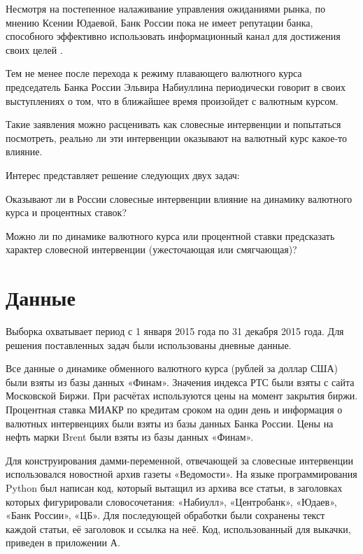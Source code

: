 \documentclass[14pt,a4paper, oneside]{extreport}
\newcounter{notes}
\renewenvironment{enumerate}%
{\begin{list}{\arabic{notes})} {\usecounter{notes}%
\setlength{\parsep}{0em}%
\setlength{\itemsep}{0em}%
\setlength{\topsep}{0.75ex}%
\setlength{\parskip}{0em}
}}%
{\end{list}}
\theoremstyle{plain}              %
\theoremstyle{definition}         %
\begin{document}
Несмотря на постепенное налаживание управления ожиданиями рынка, по мнению Ксении Юдаевой, Банк России пока не имеет репутации банка, способного эффективно использовать информационный канал для достижения своих целей \cite{UDAEVA}. 

Тем не менее после перехода к режиму плавающего валютного курса председатель Банка России Эльвира Набиуллина периодически говорит в своих выступлениях о том, что в ближайшее время произойдет с валютным курсом. 

Такие заявления можно расценивать как словесные интервенции и попытаться посмотреть, реально ли эти интервенции оказывают на валютный курс какое-то влияние.

Интерес представляет решение следующих двух задач:

\begin{enumerate}

\item[\textbf{Прямая задача:}] Оказывают ли в России словесные интервенции влияние на динамику валютного курса и процентных ставок?

\item[\textbf{Двойственная задача:}] Можно ли по динамике валютного курса или процентной ставки предсказать характер словесной интервенции (ужесточающая или смягчающая)?
\end{enumerate}

\section{Данные}

Выборка охватывает период с 1 января 2015 года по 31 декабря 2015 года. Для решения поставленных задач были использованы дневные данные. 

Все данные о динамике обменного валютного курса (рублей за доллар США)  были взяты из базы данных  «Финам». Значения индекса РТС были взяты с сайта Московской Биржи. При расчётах используются цены на момент закрытия биржи. Процентная ставка МИАКР по кредитам сроком на один день и информация о валютных интервенциях были взяты из базы данных Банка России. Цены на нефть марки Brent были взяты из базы данных «Финам».

Для конструирования дамми-переменной, отвечающей за словесные интервенции использовался новостной архив газеты «Ведомости». На языке программирования Python был написан код, который вытащил из архива все статьи, в заголовках которых фигурировали словосочетания: «Набиулл», «Центробанк», «Юдаев», «Банк России», «ЦБ». Для последующей обработки были сохранены текст каждой статьи, её заголовок и ссылка на неё. Код, использованный для выкачки, приведен в приложении А.  
\end{document}
